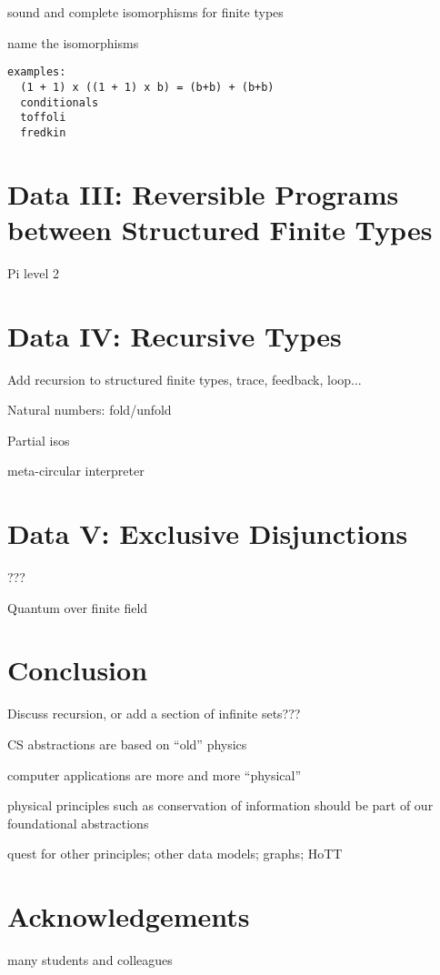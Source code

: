 \documentclass{article}
\begin{document}
sound and complete isomorphisms for finite types

name the isomorphisms

\begin{verbatim}
examples: 
  (1 + 1) x ((1 + 1) x b) = (b+b) + (b+b)
  conditionals
  toffoli
  fredkin
\end{verbatim}

\section{Data III: Reversible Programs between Structured Finite Types}

Pi level 2

\section{Data IV: Recursive Types}

Add recursion to structured finite types, trace, feedback, loop...

Natural numbers: fold/unfold

Partial isos

meta-circular interpreter
 
\section{Data V: Exclusive Disjunctions}

???

Quantum over finite field 

\section{Conclusion}

Discuss recursion, or add a section of infinite sets???

CS abstractions are based on ``old'' physics

computer applications are more and more ``physical''

physical principles such as conservation of information should be part
of our foundational abstractions

quest for other principles; other data models; graphs; HoTT

\section*{Acknowledgements} many students and colleagues 



\end{document}
